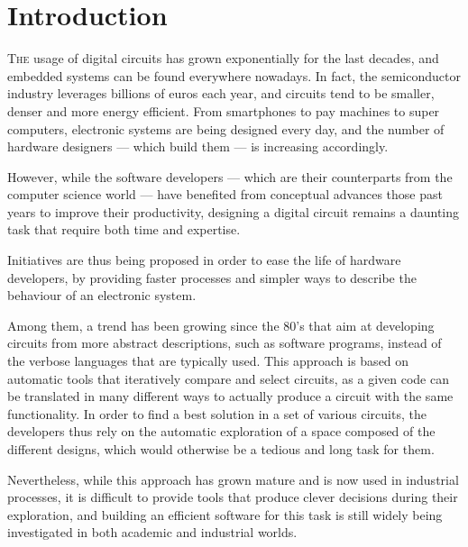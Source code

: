 \chapter{Introduction}


\lettrine[lines=2]{T}{he} usage of digital circuits has grown exponentially for the last decades, and embedded systems can be found everywhere nowadays.
In fact, the semiconductor industry leverages billions of euros each year, and circuits tend to be smaller, denser and more energy efficient.
From smartphones to pay machines to super computers, electronic systems are being designed every day, and the number of hardware designers --- which build them --- is increasing accordingly.

However, while the software developers --- which are their counterparts from the computer science world --- have benefited from conceptual advances those past years to improve their productivity, designing a digital circuit remains a daunting task that require both time and expertise.

Initiatives are thus being proposed in order to ease the life of hardware developers, by providing faster processes and simpler ways to describe the behaviour of an electronic system.

Among them, a trend has been growing since the 80's that aim at developing circuits from more abstract descriptions, such as software programs, instead of the verbose languages that are typically used.
This approach is based on automatic tools that iteratively compare and select circuits, as a given code can be translated in many different ways to actually produce a circuit with the same functionality.
In order to find a best solution in a set of various circuits, the developers thus rely on the automatic exploration of a space composed of the different designs, which would otherwise be a tedious and long task for them.

Nevertheless, while this approach has grown mature and is now used in industrial processes, it is difficult to provide tools that produce clever decisions during their exploration, and building an efficient software for this task is still widely being investigated in both academic and industrial worlds.

